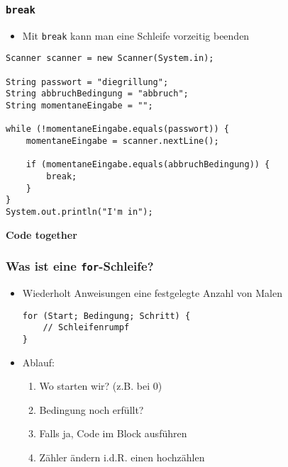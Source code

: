 \documentclass{../../presentation}
\begin{document}
\begin{frame}[fragile]
  \frametitle{\texttt{break}}

  \begin{itemize}
    \item Mit \texttt{break} kann man eine Schleife vorzeitig beenden
  \end{itemize}

  \begin{verbatim}
Scanner scanner = new Scanner(System.in);

String passwort = "diegrillung";
String abbruchBedingung = "abbruch";
String momentaneEingabe = "";

while (!momentaneEingabe.equals(passwort)) {
    momentaneEingabe = scanner.nextLine();

    if (momentaneEingabe.equals(abbruchBedingung)) {
        break;
    }
}
System.out.println("I'm in");
\end{verbatim}
\end{frame}


\begin{frame}[plain]
  \centering
  {\Huge\bfseries{Code together}}
\end{frame}



\begin{frame}[fragile]
  \frametitle{Was ist eine \texttt{for}-Schleife?}

  \begin{itemize}
    \item Wiederholt Anweisungen eine festgelegte Anzahl von Malen
          \begin{verbatim}
for (Start; Bedingung; Schritt) {
    // Schleifenrumpf
}
\end{verbatim}
    \item Ablauf:
          \begin{enumerate}
            \item Wo starten wir? (z.B. bei 0)
            \item Bedingung noch erfüllt?
            \item Falls ja, Code im Block ausführen
            \item Zähler ändern i.d.R. einen hochzählen
          \end{enumerate}
  \end{itemize}
\end{frame}
\end{document}
